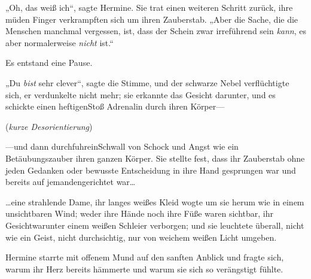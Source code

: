 „Oh, das weiß ich“, sagte Hermine. Sie trat einen weiteren Schritt zurück, ihre müden Finger verkrampften sich um ihren Zauberstab. „Aber die Sache, die die Menschen manchmal vergessen, ist, dass der Schein zwar irreführend sein \emph{kann}, es aber normalerweise \emph{nicht} ist.“

Es entstand eine Pause.

„Du \emph{bist} sehr clever“, sagte die Stimme, und der schwarze Nebel verflüchtigte sich, er verdunkelte nicht mehr; sie erkannte das Gesicht darunter, und es schickte einen heftigenStoß Adrenalin durch ihren Körper—

(\emph{kurze Desorientierung})

—und dann durchfuhreinSchwall von Schock und Angst wie ein Betäubungszauber ihren ganzen Körper. Sie stellte fest, dass ihr Zauberstab ohne jeden Gedanken oder bewusste Entscheidung in ihre Hand gesprungen war und bereits auf jemandengerichtet war…

…eine strahlende Dame, ihr langes weißes Kleid wogte um sie herum wie in einem unsichtbaren Wind; weder ihre Hände noch ihre Füße waren sichtbar, ihr Gesichtwarunter einem weißen Schleier verborgen; und sie leuchtete überall, nicht wie ein Geist, nicht durchsichtig, nur von weichem weißen Licht umgeben.

Hermine starrte mit offenem Mund auf den sanften Anblick und fragte sich, warum ihr Herz bereits hämmerte und warum sie sich so verängstigt fühlte.

